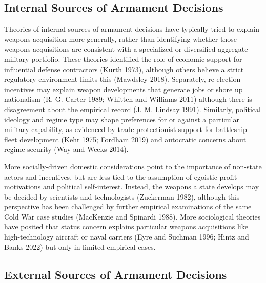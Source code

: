 \documentclass[
  12,
  letterpaper,
  DIV=11,
  numbers=noendperiod]{scrartcl}
\begin{document}
\hypertarget{internal-sources-of-armament-decisions}{%
\subsection{Internal Sources of Armament
Decisions}\label{internal-sources-of-armament-decisions}}

Theories of internal sources of armament decisions have typically tried
to explain weapons acquisition more generally, rather than identifying
whether those weapons acquisitions are consistent with a specialized or
diversified aggregate military portfolio. These theories identified the
role of economic support for influential defense contractors (Kurth
1973), although others believe a strict regulatory environment limits
this (Mawdsley 2018). Separately, re-election incentives may explain
weapon developments that generate jobs or shore up nationalism (R. G.
Carter 1989; Whitten and Williams 2011) although there is disagreement
about the empirical record (J. M. Lindsay 1991). Similarly, political
ideology and regime type may shape preferences for or against a
particular military capability, as evidenced by trade protectionist
support for battleship fleet development (Kehr 1975; Fordham 2019) and
autocratic concerns about regime security (Way and Weeks 2014).

More socially-driven domestic considerations point to the importance of
non-state actors and incentives, but are less tied to the assumption of
egoistic profit motivations and political self-interest. Instead, the
weapons a state develops may be decided by scientists and technologists
(Zuckerman 1982), although this perspective has been challenged by
further empirical examinations of the same Cold War case studies
(MacKenzie and Spinardi 1988). More sociological theories have posited
that status concern explains particular weapons acquisitions like
high-technology aircraft or naval carriers (Eyre and Suchman 1996; Hintz
and Banks 2022) but only in limited empirical cases.

\hypertarget{external-sources-of-armament-decisions}{%
\subsection{External Sources of Armament
Decisions}\label{external-sources-of-armament-decisions}}
\end{document}
